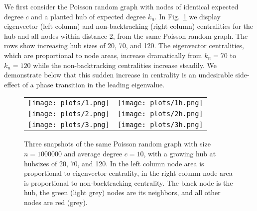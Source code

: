 \documentclass[twocolumn,prl,superscriptaddress]{revtex4}
\begin{document}
We first consider the Poisson random graph with nodes of identical expected degree $c$ and a planted hub of expected degree $k_n$. In Fig.~\ref{fig:transition} we display eigenvector (left column) and non-backtracking (right column) centralities for the hub and all nodes within distance 2, from the same Poisson random graph. The rows show increasing hub sizes of 20, 70, and 120. The eigenvector centralities, which are proportional to node areas, increase dramatically from $k_n = 70$ to $k_n = 120$ while the non-backtracking centralities increase steadily. We demonstrate below that this sudden increase in centrality is an undesirable side-effect of a phase transition in the leading eigenvalue.


\begin{figure}
\centering
\begin{tabular}{c|c}
        \texttt{[image: plots/1.png]} &
        \texttt{[image: plots/1h.png]} \\
        \texttt{[image: plots/2.png]} &
        \texttt{[image: plots/2h.png]} \\
        \texttt{[image: plots/3.png]} &
        \texttt{[image: plots/3h.png]} \\ 
\end{tabular}
\caption{Three snapshots of the same Poisson random graph with size $n=1000000$ and average degree $c=10$, with a growing hub at hubsizes of 20, 70, and 120. In the left column node area is proportional to eigenvector centrality, in the right column node area is proportional to non-backtracking centrality. The black node is the hub, the green (light grey) nodes are its neighbors, and all other nodes are red (grey).}
\label{fig:transition}
\end{figure}
\end{document}
